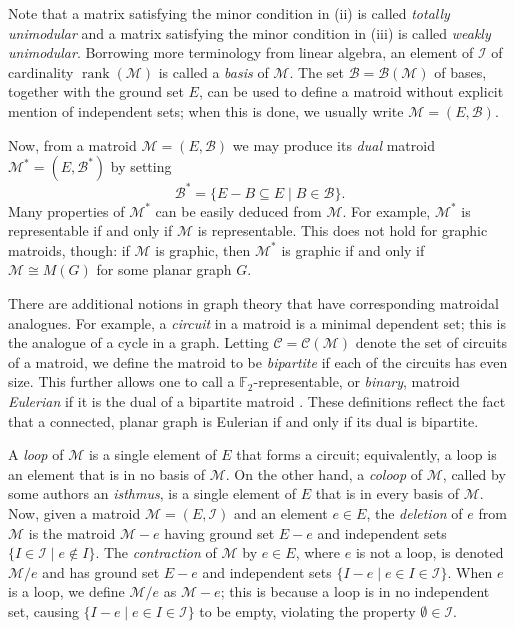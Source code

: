 \documentclass{amsart}
\numberwithin{equation}{section}
\theoremstyle{plain}
\theoremstyle{definition}
\DeclareMathOperator{\rk}{rank}
\newcommand{\FF}{\mathbb{F}}
\newcommand{\calB}{\mathcal{B}}
\newcommand{\calC}{\mathcal{C}}
\newcommand{\calI}{\mathcal{I}}
\newcommand{\calM}{\mathcal{M}}
\begin{document}
Note that a matrix satisfying the minor condition in (ii) is called \emph{totally unimodular} and a matrix satisfying the minor condition in (iii) is called \emph{weakly unimodular}.
Borrowing more terminology from linear algebra, an element of $\calI$ of cardinality $\rk(\calM)$ is called a \emph{basis} of $\calM$.
The set $\calB = \calB(\calM)$ of bases, together with the ground set $E$, can be used to define a matroid without explicit mention of independent sets; when this is done, we usually write $\calM = (E, \calB)$.

Now, from a matroid $\calM = (E,\calB)$ we may produce its \emph{dual} matroid $\calM^* = (E, \calB^*)$ by setting
\[
    \calB^* = \{E - B \subseteq E \mid B \in \calB\}.
\]
Many properties of $\calM^*$ can be easily deduced from $\calM$. 
For example, $\calM^*$ is representable if and only if $\calM$ is representable.
This does not hold for graphic matroids, though: if $\calM$ is graphic, then $\calM^*$ is graphic if and only if $\calM \cong M(G)$ for some planar graph $G$.

There are additional notions in graph theory that have corresponding matroidal analogues.
For example, a \emph{circuit} in a matroid is a minimal dependent set; this is the analogue of a cycle in a graph.
Letting $\calC = \calC(\calM)$ denote the set of circuits of a matroid, we define the matroid to be \emph{bipartite} if each of the circuits has even size. 
This further allows one to call a $\FF_2$-representable, or \emph{binary}, matroid \emph{Eulerian} if it is the dual of a bipartite matroid \cite[Proposition 9.4.1]{Oxley}.
These definitions reflect the fact that a connected, planar graph is Eulerian if and only if its dual is bipartite.

A \emph{loop} of $\calM$ is a single element of $E$ that forms a circuit; equivalently, a loop is an element that is in no basis of $\calM$. 
On the other hand, a \emph{coloop} of $\calM$, called by some authors an \emph{isthmus}, is a single element of $E$ that is in every basis of $\calM$.
Now, given a matroid $\calM = (E, \calI)$ and an element $e \in E$, the \emph{deletion} of $e$ from $\calM$ is the matroid $\calM - e$ having ground set $E - e$ and independent sets $\{ I \in \calI \mid e \notin I\}$. 
The \emph{contraction} of $\calM$ by $e \in E$, where $e$ is not a loop, is denoted $\calM / e$ and has ground set $E - e$ and independent sets $\{I - e \mid e \in I \in \calI\}$.
When $e$ is a loop, we define $\calM / e$ as $\calM - e$; this is because a loop is in no independent set, causing $\{I - e \mid e \in I \in \calI\}$ to be empty, violating the property $\emptyset \in \calI$.
\end{document}
